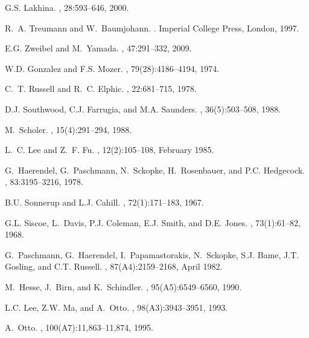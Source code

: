 \begin{thebibliography}{10}
	G.S. Lakhina.
	, 28:593--646,
	2000.
	
	R.~A. Treumann and W.~Baumjohann.
	.
	\newblock Imperial College Press, London, 1997.
	
	E.G. Zweibel and M.~Yamada.
	, 47:291--332, 2009.
	
	W.D. Gonzalez and F.S. Mozer.
	, 79(28):4186--4194, 1974.
	
	C.~T. Russell and R.~C. Elphic.
	, 22:681--715, 1978.
	
	D.J. Southwood, C.J. Farrugia, and M.A. Saunders.
	, 36(5):503--508, 1988.
	
	M.~Scholer.
	, 15(4):291--294, 1988.
	
	L.~C. Lee and Z.~F. Fu.
	, 12(2):105--108, February 1985.
	
	G.~Haerendel, G.~Paschmann, N.~Sckopke, H.~Rosenbauer, and P.C. Hedgecock.
	, 83:3195--3216, 1978.
	
	B.U. Sonnerup and L.J. Cahill.
	, 72(1):171--183, 1967.
	
	G.L. Siscoe, L.~Davis, P.J. Coleman, E.J. Smith, and D.E. Jones.
	, 73(1):61--82, 1968.
	
	G.~Paschmann, G.~Haerendel, I.~Papamastorakis, N.~Sckopke, S.J. Bame, J.T.
	Gosling, and C.T. Russell.
	, 87(A4):2159--2168, April 1982.
	
	M.~Hesse, J.~Birn, and K.~Schindler.
	, 95(A5):6549--6560, 1990.
	
	L.C. Lee, Z.W. Ma, and A.~Otto.
	, 98(A3):3943--3951, 1993.
	
	A.~Otto.
	, 100(A7):11,863--11,874, 1995.
	

\end{thebibliography}
